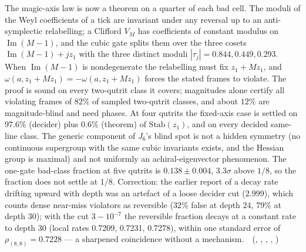 The magic-axis law is now a theorem on a quarter of each bad cell. The moduli of the Weyl coefficients of a tick are
invariant under any reversal up to an anti-symplectic relabelling; a Clifford $V_M$ has coefficients of constant modulus on
$\operatorname{Im}(M-1)$, and the cubic gate splits them over the three cosets $\operatorname{Im}(M-1)+jz_1$ with the three distinct moduli
$|\tau_j|=0.844,0.449,0.293$. When $\operatorname{Im}(M-1)$ is nondegenerate the relabelling must fix $z_1+Mz_1$, and
$\omega(a,z_1+Mz_1)=-\omega(a,z_1+Mz_1)$ forces the stated frames to violate. The proof is sound on every two-qutrit class
it covers; magnitudes alone certify all violating frames of $82\%$ of sampled two-qutrit classes, and about $12\%$ are
magnitude-blind and need phases. At four qutrits the fixed-axis case is settled on $97.6\%$ (decider) plus $0.6\%$ (theorem) of
$\mathrm{Stab}(z_1)$, and on every decided same-line class. The generic component of $J_6$'s blind spot is not a hidden symmetry
(no continuous supergroup with the same cubic invariants exists, and the Hessian group is maximal) and not uniformly an
achiral-eigenvector phenomenon. The one-gate bad-class fraction at five qutrits is $0.138\pm0.004$, $3.3\sigma$ above $1/8$, so
the fraction does not settle at $1/8$. Correction: the earlier report of a decay rate drifting upward with depth was an
artefact of a loose decider cut ($2.999$), which counts dense near-miss violators as reversible ($32\%$ false at depth $24$,
$79\%$ at depth $30$); with the cut $3-10^{-7}$ the reversible fraction decays at a constant rate to depth $30$ (local rates
0.7209, 0.7231, 0.7278), within one standard error of $\rho_{(8,8)}=0.7228$ --- a sharpened coincidence without a mechanism.
\tierT\,\tierC\ (, ,
, , )

